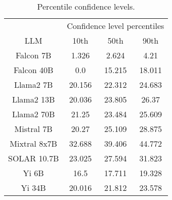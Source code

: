\begin{table*}
\centering
\begin{tabular}{c|c|c|c}
& \multicolumn{3}{c}{Confidence level percentiles} \\ 
LLM & 10th & 50th & 90th\\ \hline
Falcon 7B & 1.326 & 2.624 & 4.21\\
Falcon 40B & 0.0 & 15.215 & 18.011\\
Llama2 7B & 20.156 & 22.312 & 24.683\\
Llama2 13B & 20.036 & 23.805 & 26.37\\
Llama2 70B & 21.25 & 23.484 & 25.609\\
Mistral 7B & 20.27 & 25.109 & 28.875\\
Mixtral 8x7B & 32.688 & 39.406 & 44.772\\
SOLAR 10.7B & 23.025 & 27.594 & 31.823\\
Yi 6B & 16.5 & 17.711 & 19.328\\
Yi 34B & 20.016 & 21.812 & 23.578\\
\hline
\end{tabular}
\caption{Percentile confidence levels.}
\label{tab:percentile_conf}
\end{table*}
